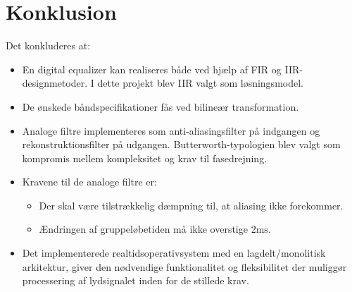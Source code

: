 \chapter{Konklusion} \label{kap:konklusion}
Det konkluderes at:
\begin{itemize}
	\item En digital equalizer kan realiseres både ved hjælp af FIR og IIR-designmetoder. I dette projekt blev IIR valgt som løsningsmodel.
	\item De ønskede båndspecifikationer fås ved bilineær transformation.
	\item Analoge filtre implementeres som anti-aliasingsfilter på indgangen og rekonstruktionsfilter på udgangen. Butterworth-typologien blev valgt som kompromis mellem kompleksitet og krav til fasedrejning.
	\item Kravene til de analoge filtre er: 
	\begin{itemize}
		\item Der skal være tilstrækkelig dæmpning til, at aliasing ikke forekommer. 
		\item Ændringen af gruppeløbetiden må ikke overstige $2\si{\milli\second}$.
	\end{itemize}
	\item Det implementerede realtidsoperativsystem med en lagdelt/monolitisk arkitektur, giver den nødvendige funktionalitet og fleksibilitet der muliggør processering af lydsignalet inden for de stillede krav. 
\end{itemize}
